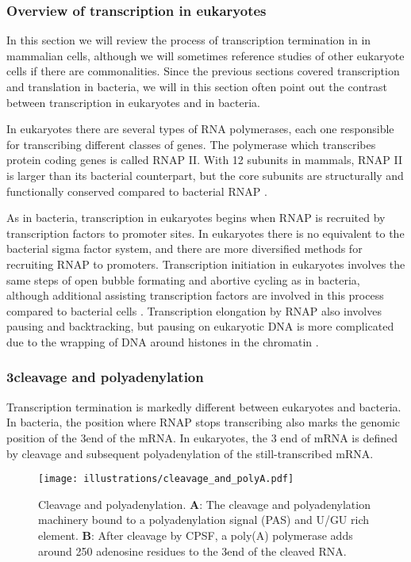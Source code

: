 %
\subsubsection{Overview of transcription in eukaryotes}
In this section we will review the process of transcription termination in in
mammalian cells, although we will sometimes reference studies of other
eukaryote cells if there are commonalities. Since the previous sections covered
transcription and translation in bacteria, we will in this section often point
out the contrast between transcription in eukaryotes and in bacteria.

In eukaryotes there are several types of RNA polymerases, each one responsible
for transcribing different classes of genes. The polymerase which transcribes
protein coding genes is called RNAP II. With 12 subunits in mammals, RNAP II is
larger than its bacterial counterpart, but the core subunits are structurally
and functionally conserved compared to bacterial RNAP \cite{ebright_rna_2000}.

As in bacteria, transcription in eukaryotes begins when RNAP is recruited by
transcription factors to promoter sites. In eukaryotes there is no equivalent
to the bacterial sigma factor system, and there are more diversified methods
for recruiting RNAP to promoters. Transcription initiation in eukaryotes
involves the same steps of open bubble formating and abortive cycling as in
bacteria, although additional assisting transcription factors are involved in
this process compared to bacterial cells \cite{wade_transition_2008}.
Transcription elongation by RNAP also involves pausing and backtracking, but
pausing on eukaryotic DNA is more complicated due to the wrapping of DNA around
histones in the chromatin \cite{sims_elongation_2004}.

\subsubsection{3\protect\ppp cleavage and polyadenylation}
Transcription termination is markedly different between eukaryotes and
bacteria. In bacteria, the position where RNAP stops transcribing also marks
the genomic position of the 3\ppp end of the mRNA. In eukaryotes, the 3\ppp
end of mRNA is defined by cleavage and subsequent polyadenylation of the
still-transcribed mRNA.

\begin{figure}[h]
	\begin{center}
		\texttt{[image: illustrations/cleavage\_and\_polyA.pdf]}
	\end{center}
	\caption{Cleavage and polyadenylation. \textbf{A}: The cleavage and
	polyadenylation machinery bound to a polyadenylation signal (PAS) and U/GU
	rich element. \textbf{B}: After cleavage by CPSF, a poly(A) polymerase adds
	around 250 adenosine residues to the 3\protect\ppp end of the cleaved RNA.}
	\label{fig:cleavage}
\end{figure}

